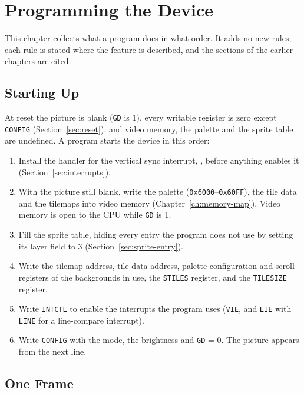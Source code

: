 \chapter{Programming the Device}
\label{ch:programming}

This chapter collects what a program does in what order. It adds no new rules; each rule is stated where the feature is
described, and the sections of the earlier chapters are cited.

\section{Starting Up}
\label{sec:startup}

At reset the picture is blank (\texttt{GD} is 1), every writable register is zero except \texttt{CONFIG}
(Section~\ref{sec:reset}), and video memory, the palette and the sprite table are undefined. A program starts the
device in this order:

\begin{enumerate}
	\item Install the handler for the vertical sync interrupt, , before anything enables it
	      (Section~\ref{sec:interrupts}).
	\item With the picture still blank, write the palette (\texttt{0x6000}--\texttt{0x60FF}), the tile data and the tilemaps into
	      video memory (Chapter~\ref{ch:memory-map}). Video memory is open to the CPU while \texttt{GD} is 1.
	\item Fill the sprite table, hiding every entry the program does not use by setting its layer field to 3
	      (Section~\ref{sec:sprite-entry}).
	\item Write the tilemap address, tile data address, palette configuration and scroll registers of the backgrounds in use, the
	      \texttt{STILES} register, and the \texttt{TILESIZE} register.
	\item Write \texttt{INTCTL} to enable the interrupts the program uses (\texttt{VIE}, and \texttt{LIE} with \texttt{LINE} for
	      a line-compare interrupt).
	\item Write \texttt{CONFIG} with the mode, the brightness and \texttt{GD} = 0. The picture appears from the next line.
\end{enumerate}

\section{One Frame}
\label{sec:frame-flow}

